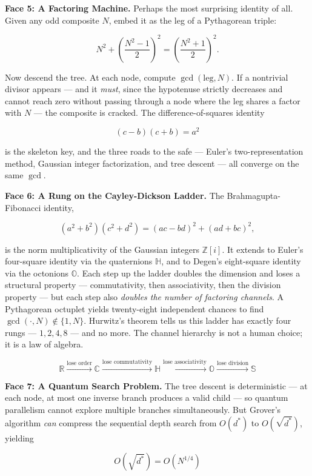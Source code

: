 \textbf{Face 5: A Factoring Machine.} Perhaps the most surprising identity of all. Given any odd composite \(N\), embed it as the leg of a Pythagorean triple:

\[
N^2 + \left(\frac{N^2 - 1}{2}\right)^{\!2} = \left(\frac{N^2 + 1}{2}\right)^{\!2}.
\]

Now descend the tree. At each node, compute \(\gcd(\text{leg}, N)\). If a nontrivial divisor appears --- and it \emph{must}, since the hypotenuse strictly decreases and cannot reach zero without passing through a node where the leg shares a factor with \(N\) --- the composite is cracked. The difference-of-squares identity

\[
(c - b)(c + b) = a^2
\]

is the skeleton key, and the three roads to the safe --- Euler's two-representation method, Gaussian integer factorization, and tree descent --- all converge on the same \(\gcd\).

\textbf{Face 6: A Rung on the Cayley-Dickson Ladder.} The Brahmagupta-Fibonacci identity,

\[
(a^2 + b^2)(c^2 + d^2) = (ac - bd)^2 + (ad + bc)^2,
\]

is the norm multiplicativity of the Gaussian integers \(\mathbb{Z}[i]\). It extends to Euler's four-square identity via the quaternions \(\mathbb{H}\), and to Degen's eight-square identity via the octonions \(\mathbb{O}\). Each step up the ladder doubles the dimension and loses a structural property --- commutativity, then associativity, then the division property --- but each step also \emph{doubles the number of factoring channels}. A Pythagorean octuplet yields twenty-eight independent chances to find \(\gcd(\cdot, N) \notin \{1, N\}\). Hurwitz's theorem tells us this ladder has exactly four rungs --- \(1, 2, 4, 8\) --- and no more. The channel hierarchy is not a human choice; it is a law of algebra.

\[
\mathbb{R} \xrightarrow{\text{lose order}} \mathbb{C} \xrightarrow{\text{lose commutativity}} \mathbb{H} \xrightarrow{\text{lose associativity}} \mathbb{O} \xrightarrow{\text{lose division}} \mathbb{S}
\]

\textbf{Face 7: A Quantum Search Problem.} The tree descent is deterministic --- at each node, at most one inverse branch produces a valid child --- so quantum parallelism cannot explore multiple branches simultaneously. But Grover's algorithm \emph{can} compress the sequential depth search from \(O(d^*)\) to \(O(\sqrt{d^*})\), yielding

\[
O(\sqrt{d^*}) = O(N^{1/4})
\]

